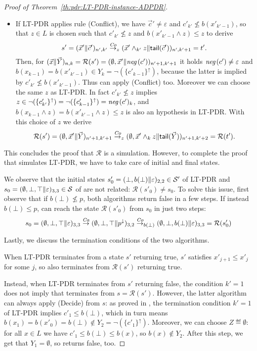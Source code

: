 \begin{proof}[Proof of Theorem~\ref{th:pdr:LT-PDR-instance-ADPDR}]
\begin{itemize}
		\item If LT-PDR applies rule (Conflict), we have $\vec{c}'\neq \varepsilon$ and $c'_{k'} \not\leq b(x'_{k'-1})$,  so that $z\in L$ is chosen such that $c'_{k'} \not \leq z$ and $b(x'_{k'-1}\land z)\leq z$ to derive
		      \[
		      s'=( \vec{x}' \| \vec{c}' )_{n',k'} \stackrel{\mathit{Co}}{\to}_z ( \vec{x}'\land_{k'} z \| \mathsf{tail}(\vec{c}'))_{n',k'+1}=t'\text{.}
		      \]
		      Then, for $( \vec{x} \| \vec{Y} )_{n,k} = \mathcal{R}(s') = ( \emptyset,\vec{x}' \| \textit{neg}\,(c') )_{n'+1,k'+1}$ it holds $\textit{neg}\,(c') \neq \varepsilon$ and $b(x_{k-1})=b(x'_{k'-1})\in Y_k=\lnot (\{ c'_{k-1} \}^{\uparrow})$, because the latter is implied by $c'_{k'} \not\leq b(x'_{k'-1})$. Thus {\ADPDR} can apply (Conflict) too. Moreover we can choose the same $z$ as LT-PDR. In fact $c'_{k'} \not \leq z$ implies $z \in \lnot (\{ c'_{k'} \}^{\uparrow})=\lnot (\{ c'_{k-1} \}^{\uparrow})=\textit{neg}\,(c')_{k}$, and $b(x_{k-1} \land z)=b(x'_{k'-1}\land z) \leq z$ is also an hypothesis in LT-PDR. With this choice of $z$ we derive
		      \[
		      \mathcal{R}(s')=( \emptyset,\vec{x}' \| \vec{Y} )_{n'+1,k'+1} \stackrel{\mathit{Co}}{\to}_z ( \emptyset,\vec{x}' \land_{k} z\| \mathsf{tail}(\vec{Y}))_{n'+1,k'+2}=\mathcal{R}(t')\text{.}
		      \]
	\end{itemize}
	This concludes the proof that $\mathcal{R}$ is a simulation. However, to complete the proof that {\ADPDR} simulates LT-PDR, we have to take care of initial and final states.

	We observe that the initial states $s'_0 = (\bot,b(\bot)\|\varepsilon)_{2,2} \in \mathcal{S}'$ of LT-PDR and $s_0 = (\emptyset,\bot,\top\|\varepsilon)_{3,3} \in \mathcal{S}$ of {\ADPDR} are not related: $\mathcal{R}(s'_0) \neq s_0$. To solve this issue, first observe that if $b(\bot) \not \leq p$, both algorithms return false in a few steps. If instead $b(\bot) \leq p$, {\ADPDR} can reach the state $\mathcal{R}(s'_0)$ from $s_0$ in just two steps:
	\[
	s_0 = (\emptyset,\bot,\top\|\varepsilon)_{3,3}
	\stackrel{\mathit{Ca}}{\to} ( \emptyset, \bot, \top \| p^{\downarrow} )_{3,2}
	\stackrel{\mathit{Co}}{\to}_{ b(\bot) } ( \emptyset, \bot, b(\bot) \| \varepsilon )_{3,3} = \mathcal{R}(s'_0)
	\]

	Lastly, we discuss the termination conditions of the two algorithms.

	When LT-PDR terminates from a state $s'$ returning true, $s'$ satisfies $x'_{j+1} \leq x'_j$ for some $j$, so also {\ADPDR} terminates from $\mathcal{R}(s')$ returning true.

	Instead, when LT-PDR terminates from $s'$ returning false, the condition $k' = 1$ does not imply that {\ADPDR} terminates from $s = \mathcal{R}(s')$. However, the latter algorithm can always apply (Decide) from $s$: as proved in \cite{KUKSH22}, the termination condition $k' = 1$ of LT-PDR implies $c'_1 \leq b(\bot)$, which in turn means $b(x_1) = b(x'_0) = b(\bot) \not \in Y_2 = \lnot (\{ c'_1 \}^{\uparrow})$. Moreover, we can choose $Z \eqdef \emptyset$: for all $x \in L$ we have $c'_1 \leq b(\bot) \leq b(x)$, so $b(x) \not \in Y_2$. After this step, we get that $Y_1 = \emptyset$, so {\ADPDR} returns false, too.
\end{proof}
